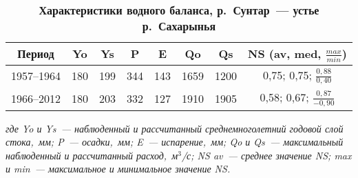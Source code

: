 
\begin{table}[H]
  \caption*{\textbf{Характеристики водного баланса, р.~Сунтар~--- устье р.~Сахарынья}}
  \label{tab:nesterova-1-tab}
  \vspace{-10pt}
  \begin{center}
  \begin{tabular}{cccccccc}
 \toprule
  Период    & Yo  & Ys  & P   & E   & Qo   & Qs   & NS 			(av, med, $\frac{max}{min}$)  \\[2pt]
 \midrule
  1957--1964 & 180 & 199 & 344 & 143 & 1659 & 1200 & 0,75; 			0,75; $\frac{0,88}{0,40}$  \\[6pt]
  1966--2012 & 180 & 203 & 332 & 127 & 1910 & 1905 & 0,58; 			0,67; $\frac{0,87}{-0,90}$ \\
\bottomrule
  \end{tabular}
\end{center}

\textit{где Yo и Ys~--- наблюденный и рассчитанный среднемноголетний годовой слой стока,~мм; P~--- осадки,~мм; E~--- испарение,~мм; Qo и Qs~--- максимальный наблюденный и рассчитанный расход,~м$^3$/с; NS av~--- среднее значение NS; max и min~--- максимальное и минимальное значение NS.}
\end{table}
